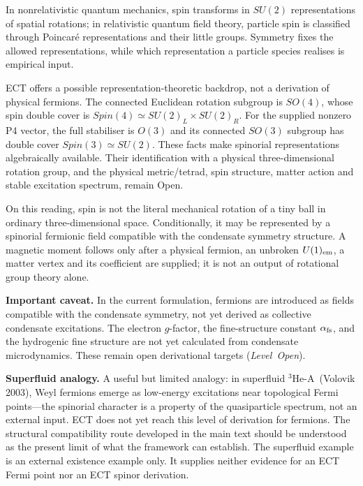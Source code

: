 \documentclass[11pt,a4paper]{article}
\begin{document}
In nonrelativistic quantum mechanics, spin transforms in $SU(2)$
representations of spatial rotations; in relativistic quantum field theory,
particle spin is classified through Poincar\'e representations and their
little groups.  Symmetry fixes the allowed representations, while which
representation a particle species realises is empirical input.

ECT offers a possible representation-theoretic backdrop, not a derivation
of physical fermions.  The connected Euclidean rotation subgroup is
$SO(4)$, whose spin double cover is
$Spin(4)\simeq SU(2)_L\times SU(2)_R$.  For the supplied nonzero P4 vector,
the full stabiliser is $O(3)$ and its connected $SO(3)$ subgroup has double
cover $Spin(3)\simeq SU(2)$.  These facts make spinorial representations
algebraically available.  Their identification with a physical
three-dimensional rotation group, and the physical metric/tetrad, spin
structure, matter action and stable excitation spectrum, remain Open.

On this reading, spin is not the literal mechanical rotation of a tiny ball in ordinary three-dimensional space.
Conditionally, it may be represented by a spinorial fermionic field compatible with the condensate symmetry structure.  A magnetic moment follows only after a physical fermion, an unbroken $U(1)_{\rm em}$, a matter vertex and its coefficient are supplied; it is not an output of rotational group theory alone.

\textbf{Important caveat.}
In the current formulation, fermions are introduced as fields compatible with the condensate symmetry, not yet derived as collective condensate excitations.
The electron $g$-factor, the fine-structure constant $\alpha_{\rm fs}$, and the hydrogenic fine structure are not yet calculated from condensate microdynamics.
These remain open derivational targets (\emph{Level~Open}).

\textbf{Superfluid analogy.}
A useful but limited analogy: in superfluid ${}^3$He-A~(Volovik 2003), Weyl fermions emerge as low-energy excitations near topological Fermi points---the spinorial character is a property of the quasiparticle spectrum, not an external input.
ECT does not yet reach this level of derivation for fermions.
The structural compatibility route developed in the main text should be understood as the present limit of what the framework can establish.
The superfluid example is an external existence example only.  It supplies
neither evidence for an ECT Fermi point nor an ECT spinor derivation.
\end{document}
